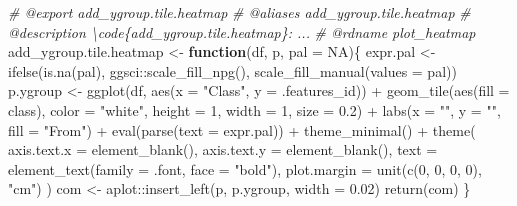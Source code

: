 \documentclass[
]{article}
\newenvironment{Shaded}{\begin{snugshade}}{\end{snugshade}}
\newcommand{\AttributeTok}[1]{\textcolor[rgb]{0.77,0.63,0.00}{#1}}
\newcommand{\CommentTok}[1]{\textcolor[rgb]{0.56,0.35,0.01}{\textit{#1}}}
\newcommand{\ConstantTok}[1]{\textcolor[rgb]{0.00,0.00,0.00}{#1}}
\newcommand{\ControlFlowTok}[1]{\textcolor[rgb]{0.13,0.29,0.53}{\textbf{#1}}}
\newcommand{\DecValTok}[1]{\textcolor[rgb]{0.00,0.00,0.81}{#1}}
\newcommand{\FloatTok}[1]{\textcolor[rgb]{0.00,0.00,0.81}{#1}}
\newcommand{\FunctionTok}[1]{\textcolor[rgb]{0.00,0.00,0.00}{#1}}
\newcommand{\NormalTok}[1]{#1}
\newcommand{\OtherTok}[1]{\textcolor[rgb]{0.56,0.35,0.01}{#1}}
\newcommand{\SpecialCharTok}[1]{\textcolor[rgb]{0.00,0.00,0.00}{#1}}
\newcommand{\StringTok}[1]{\textcolor[rgb]{0.31,0.60,0.02}{#1}}
\begin{document}
\begin{Shaded}
\begin{Highlighting}[]
\CommentTok{\#\textquotesingle{} @export add\_ygroup.tile.heatmap}
\CommentTok{\#\textquotesingle{} @aliases add\_ygroup.tile.heatmap}
\CommentTok{\#\textquotesingle{} @description \textbackslash{}code\{add\_ygroup.tile.heatmap\}: ...}
\CommentTok{\#\textquotesingle{} @rdname plot\_heatmap}
\NormalTok{add\_ygroup.tile.heatmap }\OtherTok{\textless{}{-}}
  \ControlFlowTok{function}\NormalTok{(df, p, }\AttributeTok{pal =} \ConstantTok{NA}\NormalTok{)\{}
\NormalTok{    expr.pal }\OtherTok{\textless{}{-}} \FunctionTok{ifelse}\NormalTok{(}\FunctionTok{is.na}\NormalTok{(pal),}
      \StringTok{\textquotesingle{}ggsci::scale\_fill\_npg()\textquotesingle{}}\NormalTok{,}
      \StringTok{\textquotesingle{}scale\_fill\_manual(values = pal)\textquotesingle{}}\NormalTok{)}
\NormalTok{    p.ygroup }\OtherTok{\textless{}{-}} \FunctionTok{ggplot}\NormalTok{(df, }\FunctionTok{aes}\NormalTok{(}\AttributeTok{x =} \StringTok{"Class"}\NormalTok{, }\AttributeTok{y =}\NormalTok{ .features\_id)) }\SpecialCharTok{+}
      \FunctionTok{geom\_tile}\NormalTok{(}\FunctionTok{aes}\NormalTok{(}\AttributeTok{fill =}\NormalTok{ class),}
        \AttributeTok{color =} \StringTok{"white"}\NormalTok{, }\AttributeTok{height =} \DecValTok{1}\NormalTok{, }\AttributeTok{width =} \DecValTok{1}\NormalTok{, }\AttributeTok{size =} \FloatTok{0.2}\NormalTok{) }\SpecialCharTok{+}
      \FunctionTok{labs}\NormalTok{(}\AttributeTok{x =} \StringTok{""}\NormalTok{, }\AttributeTok{y =} \StringTok{""}\NormalTok{, }\AttributeTok{fill =} \StringTok{"From"}\NormalTok{) }\SpecialCharTok{+}
      \FunctionTok{eval}\NormalTok{(}\FunctionTok{parse}\NormalTok{(}\AttributeTok{text =}\NormalTok{ expr.pal)) }\SpecialCharTok{+}
      \FunctionTok{theme\_minimal}\NormalTok{() }\SpecialCharTok{+}
      \FunctionTok{theme}\NormalTok{(}
        \AttributeTok{axis.text.x =} \FunctionTok{element\_blank}\NormalTok{(),}
        \AttributeTok{axis.text.y =} \FunctionTok{element\_blank}\NormalTok{(),}
        \AttributeTok{text =} \FunctionTok{element\_text}\NormalTok{(}\AttributeTok{family =}\NormalTok{ .font, }\AttributeTok{face =} \StringTok{"bold"}\NormalTok{),}
        \AttributeTok{plot.margin =} \FunctionTok{unit}\NormalTok{(}\FunctionTok{c}\NormalTok{(}\DecValTok{0}\NormalTok{, }\DecValTok{0}\NormalTok{, }\DecValTok{0}\NormalTok{, }\DecValTok{0}\NormalTok{), }\StringTok{"cm"}\NormalTok{)}
\NormalTok{      )}
\NormalTok{      com }\OtherTok{\textless{}{-}}\NormalTok{ aplot}\SpecialCharTok{::}\FunctionTok{insert\_left}\NormalTok{(p, p.ygroup, }\AttributeTok{width =} \FloatTok{0.02}\NormalTok{) }
      \FunctionTok{return}\NormalTok{(com)}
\NormalTok{  \}}
\end{Highlighting}
\end{Shaded}
\end{document}
